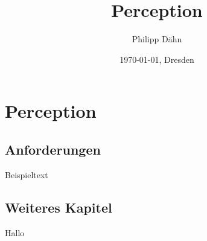 \documentclass[../documentation.tex]{subfiles}
\title{Perception}
\author{Philipp Dähn}
\date{\today{}, Dresden}
\begin{document}
\onlyinsubfile{\maketitle\tableofcontents}
\section{Perception}

\subsection{Anforderungen}
\label{sec:anforderungen}

Beispieltext

\subsection{Weiteres Kapitel}
\label{sec:weitereskapitel}

Hallo
\end{document}
